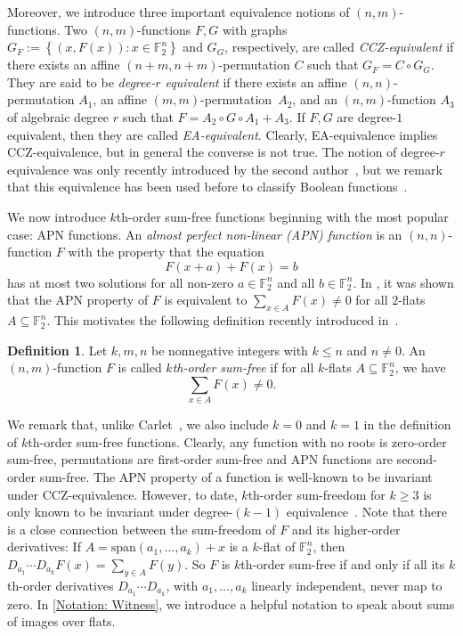 \documentclass[12pt]{article}
\theoremstyle{definition}
\newtheorem{defn}[thm]{Definition}
\newcommand{\Fpnv}{\mathbb{F}_2^n}
\newcommand{\set}[1]{\left\{#1\right\}}
\begin{document}
Moreover, we introduce three important equivalence notions of $(n,m)$-functions. Two $(n,m)$-functions $F,G$ with graphs $G_F := \set{(x,F(x)) : x\in\Fpnv}$ and $G_G$, respectively, are called \emph{CCZ-equivalent} if there exists an affine $(n+m,n+m)$-permutation $C$ such that $G_F = C\circ G_G$. They are said to be \emph{degree-$r$ equivalent} if there exists an affine $(n,n)$-permutation $A_1$, an affine $(m,m)$-permutation~$A_2$, and an $(n,m)$-function $A_3$ of algebraic degree $r$ such that $F = A_2 \circ G \circ A_1 + A_3$.  If $F,G$ are degree-$1$ equivalent, then they are called \emph{EA-equivalent}. Clearly, EA-equivalence implies CCZ-equivalence, but in general the converse is not true. 
The notion of degree-$r$ equivalence was only recently introduced by the second author~\cite{kaspers2026WCC}, but we remark that this equivalence has been used before to classify Boolean functions~\cite{hou1996,langevinleander2008}.


We now introduce $k$th-order sum-free functions beginning with the most popular case: APN functions. An \emph{almost perfect non-linear (APN) function} is an $(n,n)$-function $F$ with the property that the equation
\[
    F(x+a)+F(x) = b
\]
has at most two solutions for all non-zero $a\in\Fpnv$ and all $b\in\Fpnv$. In \cite{brinkmannleander2008,hou2006}, it was shown that the APN property of $F$ is equivalent to $\sum_{x\in A}F(x)\ne0$ for all $2$-flats $A\subseteq\Fpnv$. This motivates the following definition recently introduced in~\cite{carlet2025inverse,carlet2025generalizations}.
\begin{defn}
\label{def:sum-free}
    Let $k,m,n$ be nonnegative integers with $k \le n$ and $n\ne 0$. An $(n,m)$-function $F$ is called \emph{$k$th-order sum-free} if for all $k$-flats $A\subseteq\Fpnv$, we have
    \[
        \sum_{x\in A}F(x) \ne 0.
    \]
\end{defn}
We remark that, unlike Carlet~\cite{carlet2025generalizations}, we also include $k=0$ and $k=1$ in the definition of $k$th-order sum-free functions. Clearly, any function with no roots is zero-order sum-free, permutations are first-order sum-free and APN functions are second-order sum-free. The APN property of a function is well-known to be invariant under CCZ-equivalence. However, to date, $k$th-order sum-freedom for $k\ge 3$ is only known to be invariant under degree-$(k-1)$ equivalence~\cite{kaspers2026WCC}. Note that there is a close connection between the sum-freedom of $F$ and its higher-order derivatives: If $A = \text{span}(a_1,\dots,a_k)+x$ is a $k$-flat of $\Fpnv$, then $D_{a_1}\cdots D_{a_k}F(x) = \sum_{y\in A}F(y)$. So $F$ is $k$th-order sum-free if and only if all its $k$th-order derivatives $D_{a_1}\cdots D_{a_k}$, with $a_1,\dots,a_k$ linearly independent, never map to zero. In \cref{Notation: Witness}, we introduce a helpful notation to speak about sums of images over flats.
\end{document}
